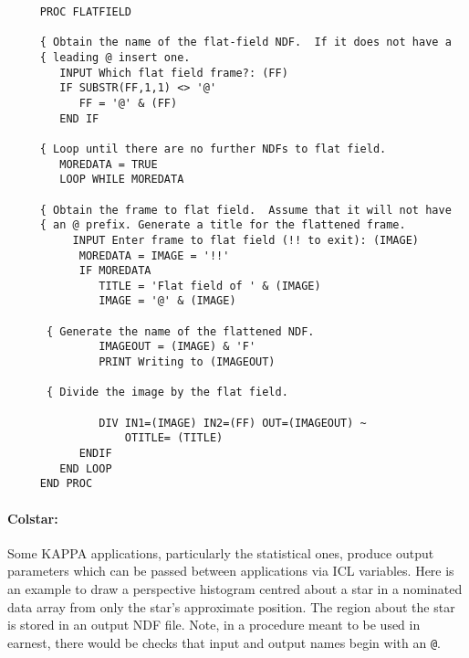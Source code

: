 \begin{small}
\begin{verbatim}
     PROC FLATFIELD

     { Obtain the name of the flat-field NDF.  If it does not have a
     { leading @ insert one.
        INPUT Which flat field frame?: (FF)
        IF SUBSTR(FF,1,1) <> '@'
           FF = '@' & (FF)
        END IF

     { Loop until there are no further NDFs to flat field.
        MOREDATA = TRUE
        LOOP WHILE MOREDATA

     { Obtain the frame to flat field.  Assume that it will not have
     { an @ prefix. Generate a title for the flattened frame.
          INPUT Enter frame to flat field (!! to exit): (IMAGE)
           MOREDATA = IMAGE = '!!'
           IF MOREDATA
              TITLE = 'Flat field of ' & (IMAGE)
              IMAGE = '@' & (IMAGE)

      { Generate the name of the flattened NDF.
              IMAGEOUT = (IMAGE) & 'F'
              PRINT Writing to (IMAGEOUT)

      { Divide the image by the flat field.

              DIV IN1=(IMAGE) IN2=(FF) OUT=(IMAGEOUT) ~
                  OTITLE= (TITLE)
           ENDIF
        END LOOP
     END PROC
\end{verbatim}
\end{small}

\paragraph{Colstar:}\hfill

Some {\small KAPPA} applications, particularly the statistical ones, produce
output parameters which can be passed between applications via {\small ICL}
variables.
Here is an example to draw a perspective histogram centred about a star in a
nominated data array from only the star's approximate position.
The region about the star is stored in an output NDF file.
Note, in a procedure meant to be used in earnest, there would be checks that
input and output names begin with an {\tt @}.

